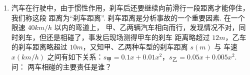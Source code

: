 \documentclass[a4paper,11pt]{article}
\begin{document}
\begin{enumerate}
\ans{$[1,4]$}

\ansspace[6]

\item 汽车在行驶中，由于惯性作用，刹车后还要继续向前滑行一段距离才能停住，我们称这段
距离为“刹车距离”. 刹车距离是分析事故的一个重要因素. 在一个限速 $40km/h$ 以内的弯道上，
甲、乙两辆汽车相向而行，发现情况不对，同时刹车，但还是相碰了，事发后现场测得甲车的刹车
距离略超过 $12m$，乙车的刹车距离略超过 $10m$，又知甲、乙两种车型的刹车距离 $s(m)$ 与
车速 $x(km/h)$ 之间有如下关系：$s_{\text{甲}}=0.1x+0.01x^2$，$s_{\text{乙}}=0.05x+0.005x^2$. 问：
两车相碰的主要责任是谁？

\ifanswer
\solbegin
{}
\solend

\fi

\ansspace*[8]

\end{enumerate}
\end{document}
